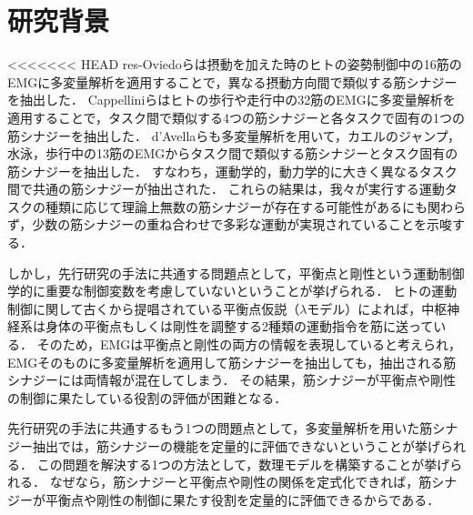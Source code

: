 \section{研究背景}
<<<<<<< HEAD
res-Oviedoらは摂動を加えた時のヒトの姿勢制御中の16筋のEMGに多変量解析を適用することで，異なる摂動方向間で類似する筋シナジーを抽出した\cite{Torres-Oviedo2007}．
Cappelliniらはヒトの歩行や走行中の32筋のEMGに多変量解析を適用することで，タスク間で類似する4つの筋シナジーと各タスクで固有の1つの筋シナジーを抽出した\cite{Cappellini2006}．
d'Avellaらも多変量解析を用いて，カエルのジャンプ，水泳，歩行中の13筋のEMGからタスク間で類似する筋シナジーとタスク固有の筋シナジーを抽出した\cite{d'Avella2005}．
すなわち，運動学的，動力学的に大きく異なるタスク間で共通の筋シナジーが抽出された．
これらの結果は，我々が実行する運動タスクの種類に応じて理論上無数の筋シナジーが存在する可能性があるにも関わらず，少数の筋シナジーの重ね合わせで多彩な運動が実現されていることを示唆する．

しかし，先行研究の手法に共通する問題点として，平衡点と剛性という運動制御学的に重要な制御変数を考慮していないということが挙げられる．
ヒトの運動制御に関して古くから提唱されている平衡点仮説（$\lambda$モデル）によれば，中枢神経系は身体の平衡点もしくは剛性を調整する2種類の運動指令を筋に送っている\cite{Feldman2008}．
そのため，EMGは平衡点と剛性の両方の情報を表現していると考えられ，EMGそのものに多変量解析を適用して筋シナジーを抽出しても，抽出される筋シナジーには両情報が混在してしまう．
その結果，筋シナジーが平衡点や剛性の制御に果たしている役割の評価が困難となる．

先行研究の手法に共通するもう1つの問題点として，多変量解析を用いた筋シナジー抽出では，筋シナジーの機能を定量的に評価できないということが挙げられる．
この問題を解決する1つの方法として，数理モデルを構築することが挙げられる．
なぜなら，筋シナジーと平衡点や剛性の関係を定式化できれば，筋シナジーが平衡点や剛性の制御に果たす役割を定量的に評価できるからである．

